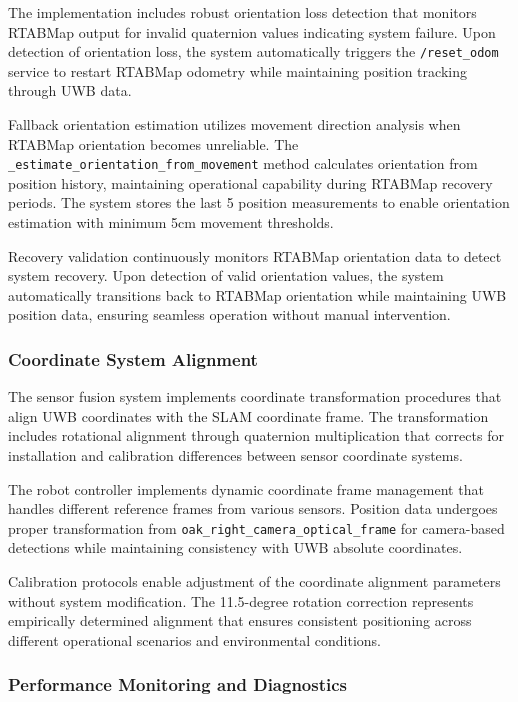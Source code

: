 The implementation includes robust orientation loss detection that monitors RTABMap output for invalid quaternion values indicating system failure. Upon detection of orientation loss, the system automatically triggers the \texttt{/reset\_odom} service to restart RTABMap odometry while maintaining position tracking through UWB data.

Fallback orientation estimation utilizes movement direction analysis when RTABMap orientation becomes unreliable. The \texttt{\_estimate\_orientation\_from\_movement} method calculates orientation from position history, maintaining operational capability during RTABMap recovery periods. The system stores the last 5 position measurements to enable orientation estimation with minimum 5cm movement thresholds.

Recovery validation continuously monitors RTABMap orientation data to detect system recovery. Upon detection of valid orientation values, the system automatically transitions back to RTABMap orientation while maintaining UWB position data, ensuring seamless operation without manual intervention.

\subsubsection{Coordinate System Alignment}

The sensor fusion system implements coordinate transformation procedures that align UWB coordinates with the SLAM coordinate frame. The transformation includes rotational alignment through quaternion multiplication that corrects for installation and calibration differences between sensor coordinate systems.

The robot controller implements dynamic coordinate frame management that handles different reference frames from various sensors. Position data undergoes proper transformation from \texttt{oak\_right\_camera\_optical\_frame} for camera-based detections while maintaining consistency with UWB absolute coordinates.

Calibration protocols enable adjustment of the coordinate alignment parameters without system modification. The 11.5-degree rotation correction represents empirically determined alignment that ensures consistent positioning across different operational scenarios and environmental conditions.

\subsubsection{Performance Monitoring and Diagnostics}

